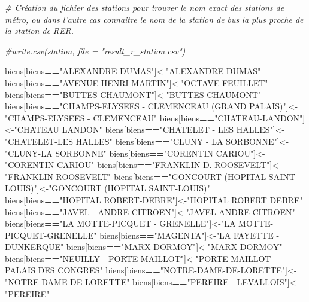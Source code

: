 \documentclass[french,]{article}
\newenvironment{Shaded}{\begin{snugshade}}{\end{snugshade}}
\newcommand{\CommentTok}[1]{\textcolor[rgb]{0.56,0.35,0.01}{\textit{#1}}}
\newcommand{\NormalTok}[1]{#1}
\newcommand{\OperatorTok}[1]{\textcolor[rgb]{0.81,0.36,0.00}{\textbf{#1}}}
\newcommand{\StringTok}[1]{\textcolor[rgb]{0.31,0.60,0.02}{#1}}
\begin{document}
\begin{Shaded}
\begin{Highlighting}[]
\CommentTok{# Création du fichier des stations pour trouver le nom exact des stations de métro, ou dans l'autre cas connaitre le nom de la station de bus la plus proche de la station de RER. }

\CommentTok{#write.csv(station, file = "result_r_station.csv") }

\NormalTok{biens[biens}\OperatorTok{==}\StringTok{"ALEXANDRE DUMAS"}\NormalTok{]<-}\StringTok{"ALEXANDRE-DUMAS"}
\NormalTok{biens[biens}\OperatorTok{==}\StringTok{"AVENUE HENRI MARTIN"}\NormalTok{]<-}\StringTok{"OCTAVE FEUILLET"}
\NormalTok{biens[biens}\OperatorTok{==}\StringTok{"BUTTES CHAUMONT"}\NormalTok{]<-}\StringTok{"BUTTES-CHAUMONT"}
\NormalTok{biens[biens}\OperatorTok{==}\StringTok{"CHAMPS-ELYSEES - CLEMENCEAU (GRAND PALAIS)"}\NormalTok{]<-}\StringTok{"CHAMPS-ELYSEES - CLEMENCEAU"}
\NormalTok{biens[biens}\OperatorTok{==}\StringTok{"CHATEAU-LANDON"}\NormalTok{]<-}\StringTok{"CHATEAU LANDON"}
\NormalTok{biens[biens}\OperatorTok{==}\StringTok{"CHATELET - LES HALLES"}\NormalTok{]<-}\StringTok{"CHATELET-LES HALLES"}
\NormalTok{biens[biens}\OperatorTok{==}\StringTok{"CLUNY - LA SORBONNE"}\NormalTok{]<-}\StringTok{"CLUNY-LA SORBONNE"}
\NormalTok{biens[biens}\OperatorTok{==}\StringTok{"CORENTIN CARIOU"}\NormalTok{]<-}\StringTok{"CORENTIN-CARIOU"}
\NormalTok{biens[biens}\OperatorTok{==}\StringTok{"FRANKLIN D. ROOSEVELT"}\NormalTok{]<-}\StringTok{"FRANKLIN-ROOSEVELT"}
\NormalTok{biens[biens}\OperatorTok{==}\StringTok{"GONCOURT (HOPITAL-SAINT-LOUIS)"}\NormalTok{]<-}\StringTok{"GONCOURT (HOPITAL SAINT-LOUIS)"}
\NormalTok{biens[biens}\OperatorTok{==}\StringTok{"HOPITAL ROBERT-DEBRE"}\NormalTok{]<-}\StringTok{"HOPITAL ROBERT DEBRE"}
\NormalTok{biens[biens}\OperatorTok{==}\StringTok{"JAVEL - ANDRE CITROEN"}\NormalTok{]<-}\StringTok{"JAVEL-ANDRE-CITROEN"}
\NormalTok{biens[biens}\OperatorTok{==}\StringTok{"LA MOTTE-PICQUET - GRENELLE"}\NormalTok{]<-}\StringTok{"LA MOTTE-PICQUET-GRENELLE"}
\NormalTok{biens[biens}\OperatorTok{==}\StringTok{"MAGENTA"}\NormalTok{]<-}\StringTok{"LA FAYETTE - DUNKERQUE"}
\NormalTok{biens[biens}\OperatorTok{==}\StringTok{"MARX DORMOY"}\NormalTok{]<-}\StringTok{"MARX-DORMOY"}
\NormalTok{biens[biens}\OperatorTok{==}\StringTok{"NEUILLY - PORTE MAILLOT"}\NormalTok{]<-}\StringTok{"PORTE MAILLOT - PALAIS DES CONGRES"}
\NormalTok{biens[biens}\OperatorTok{==}\StringTok{"NOTRE-DAME-DE-LORETTE"}\NormalTok{]<-}\StringTok{"NOTRE-DAME DE LORETTE"}
\NormalTok{biens[biens}\OperatorTok{==}\StringTok{"PEREIRE - LEVALLOIS"}\NormalTok{]<-}\StringTok{"PEREIRE"}

\end{Highlighting}
\end{Shaded}
\end{document}

